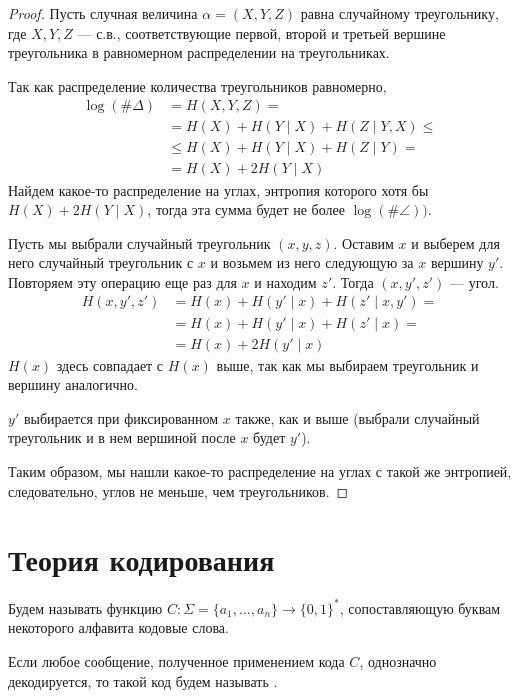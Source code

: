 \begin{proof}
 	Пусть случная величина $ \alpha = (X, Y, Z)$ равна случайному треугольнику, где $ X, Y, Z$ --- с.в., соответствующие первой, второй и третьей вершине треугольника в равномерном распределении на треугольниках. 

	Так как распределение количества треугольников равномерно,
	\begin{align*}
		\log (\# \Delta)& = H(X, Y, Z)  = \\
					  &= H(X) + H(Y \mid  X) + H(Z \mid  Y, X) \le \tag{Chain rule}  \\
					  & \le  H(X) + H(Y \mid X) + H(Z \mid Y) = \tag{циклический сдвиг в треугольнике} \\
		 & = H(X) + 2 H(Y \mid X)
	\end{align*}
Найдем какое-то распределение на углах, энтропия которого хотя бы $ H(X) + 2H(Y \mid X)$, тогда эта сумма будет не более  $  \log (\# \angle)) $.

	Пусть мы выбрали случайный треугольник $ (x, y, z)$. Оставим $ x$ и выберем для него случайный треугольник с $ x$ и возьмем из него следующую за $ x$ вершину $ y'$. Повторяем эту операцию еще раз для $ x$ и находим  $ z'$. Тогда $ (x,  y', z')$ --- угол.
	\begin{align*}
		H(x, y', z') & = H(x) + H(y' \mid x) + H(z' \mid x, y') = \tag{Так как $ y'$ и  $ z'$ независимы при выбранном  $ x$}  \\
					 & =H(x) + H(y'\mid x) + H(z' \mid x) = \tag{Выбор аналогичный} \\
					 & = H(x) + 2 H(y' \mid x)
	\end{align*}
	$ H(x)$ здесь совпадает с  $ H(x) $ выше, так как мы выбираем треугольник и вершину аналогично.

	$ y'$ выбирается при фиксированном  $ x$ также, как и выше (выбрали случайный треугольник и в нем вершиной после $ x$ будет  $ y'$).

	Таким образом, мы нашли какое-то распределение на углах с такой же энтропией, следовательно, углов не меньше, чем треугольников.
\end{proof}



\chapter{Теория кодирования}
\begin{defn}[Код]
	Будем называть  функцию $ C \colon \Sigma = \{a_1, \ldots , a_n\} \to \{0, 1\}^{*}$, сопоставляющую буквам некоторого алфавита кодовые слова.

	Если любое сообщение, полученное применением кода $ C$, однозначно декодируется, то такой код будем называть .
\end{defn}


